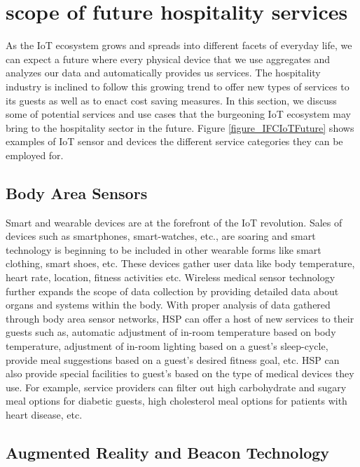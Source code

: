 \documentclass[10pt,journal,letterpaper]{IEEEtran}
\begin{document}
{\section{scope of future hospitality services}
\label{section_future_services}

As the IoT ecosystem grows and spreads into different facets of everyday life, we can expect a future where every physical device that we use aggregates and analyzes our data and automatically provides us services. The hospitality industry is inclined to follow this growing trend to offer new types of services to its guests as well as to enact cost saving measures. In this section, we discuss some of potential services and use cases that the burgeoning IoT ecosystem may bring to the hospitality sector in the future. Figure \ref{figure_IFCIoTFuture} shows examples of IoT sensor and devices the different service categories they can be employed for.


\subsection*{Body Area Sensors}

Smart and wearable devices are at the forefront of the IoT revolution. Sales of devices such as smartphones, smart-watches, etc., are soaring and smart technology is beginning to be included in other wearable forms like smart clothing, smart shoes, etc. These devices gather user data like body temperature, heart rate, location, fitness activities etc. Wireless medical sensor technology further expands the scope of data collection by providing detailed data about organs and systems within the body. With proper analysis of data gathered through body area sensor networks, HSP can offer a host of new services to their guests such as, automatic adjustment of in-room temperature based on body temperature, adjustment of in-room lighting based on a guest's sleep-cycle, provide meal suggestions based on a guest's desired fitness goal, etc. HSP can also provide special facilities to guest's based on the type of medical devices they use. For example, service providers can filter out high carbohydrate and sugary meal options for diabetic guests, high cholesterol meal options for patients with heart disease, etc.


\subsection*{Augmented Reality and Beacon Technology}

}
\end{document}
